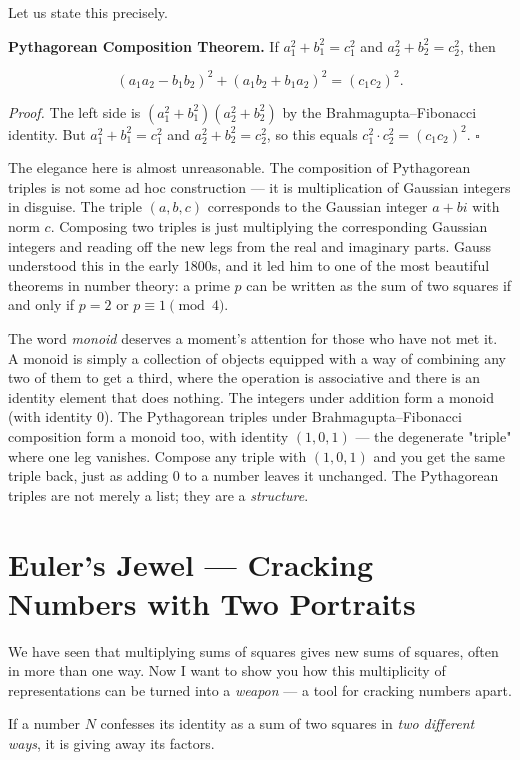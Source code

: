 \documentclass[11pt,twoside,openright]{book}
\theoremstyle{definition}
\theoremstyle{remark}
\begin{document}
Let us state this precisely.

\textbf{Pythagorean Composition Theorem.} If $a_1^2 + b_1^2 = c_1^2$ and $a_2^2 + b_2^2 = c_2^2$, then

\[(a_1 a_2 - b_1 b_2)^2 + (a_1 b_2 + b_1 a_2)^2 = (c_1 c_2)^2.\]

\textit{Proof.} The left side is $(a_1^2 + b_1^2)(a_2^2 + b_2^2)$ by the Brahmagupta--Fibonacci identity. But $a_1^2 + b_1^2 = c_1^2$ and $a_2^2 + b_2^2 = c_2^2$, so this equals $c_1^2 \cdot c_2^2 = (c_1 c_2)^2$. $\square$

The elegance here is almost unreasonable. The composition of Pythagorean triples is not some ad hoc construction --- it is multiplication of Gaussian integers in disguise. The triple $(a, b, c)$ corresponds to the Gaussian integer $a + bi$ with norm $c$. Composing two triples is just multiplying the corresponding Gaussian integers and reading off the new legs from the real and imaginary parts. Gauss understood this in the early 1800s, and it led him to one of the most beautiful theorems in number theory: a prime $p$ can be written as the sum of two squares if and only if $p = 2$ or $p \equiv 1 \pmod{4}$.


The word \textit{monoid} deserves a moment's attention for those who have not met it. A monoid is simply a collection of objects equipped with a way of combining any two of them to get a third, where the operation is associative and there is an identity element that does nothing. The integers under addition form a monoid (with identity $0$). The Pythagorean triples under Brahmagupta--Fibonacci composition form a monoid too, with identity $(1, 0, 1)$ --- the degenerate "triple" where one leg vanishes. Compose any triple with $(1, 0, 1)$ and you get the same triple back, just as adding $0$ to a number leaves it unchanged. The Pythagorean triples are not merely a list; they are a \textit{structure}.


\section{Euler's Jewel --- Cracking Numbers with Two Portraits}

We have seen that multiplying sums of squares gives new sums of squares, often in more than one way. Now I want to show you how this multiplicity of representations can be turned into a \textit{weapon} --- a tool for cracking numbers apart.

If a number $N$ confesses its identity as a sum of two squares in \textit{two different ways}, it is giving away its factors.
\end{document}
